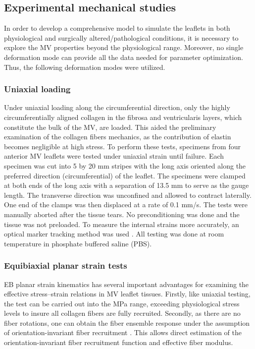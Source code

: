 \subsection{Experimental mechanical studies} \label{c2:sec:mechanicalstudies}

    In order to develop a comprehensive model to simulate the leaflets in both physiological and surgically altered/pathological conditions, it is necessary to explore the MV properties beyond the physiological range. Moreover, no single deformation mode can provide all the data needed for parameter optimization. Thus, the following deformation modes were utilized.


\subsubsection{Uniaxial loading}

    Under uniaxial loading along the circumferential direction, only the highly circumferentially aligned collagen in the fibrosa and ventricularis layers, which constitute the bulk of the MV, are loaded. This aided the preliminary examination of the collagen fibers mechanics, as the contribution of elastin becomes negligible at high stress. To perform these tests, specimens from four anterior MV leaflets were tested under uniaxial strain until failure. Each specimen was cut into 5 by 20 mm stripes with the long axis oriented along the preferred direction (circumferential) of the leaflet. The specimens were clamped at both ends of the long axis with a separation of 13.5 mm to serve as the gauge length. The transverse direction was unconfined and allowed to contract laterally. One end of the clamps was then displaced at a rate of 0.1 mm/s. The tests were manually aborted after the tissue tears. No preconditioning was done and the tissue was not preloaded. To measure the internal strains more accurately, an optical marker tracking method was used \cite{billiar_biaxial_2000}. All testing was done at room temperature in phosphate buffered saline (PBS).


\subsubsection{Equibiaxial planar strain tests}

    EB planar strain kinematics has several important advantages for examining the effective stress–strain relations in MV leaflet tissues. Firstly, like uniaxial testing, the test can be carried out into the MPa range, exceeding physiological stress levels to insure all collagen fibers are fully recruited. Secondly, as there are no fiber rotations, one can obtain the fiber ensemble response under the assumption of orientation-invariant fiber recruitment \cite{fata_insights_2014,sacks_incorporation_2003,fan_simulation_2014}. This allows direct estimation of the orientation-invariant fiber recruitment function and effective fiber modulus.
    
